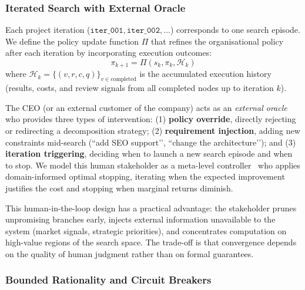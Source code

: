 \documentclass[11pt,a4paper]{article}
\begin{document}
\subsubsection{Iterated Search with External Oracle}

Each project iteration ($\texttt{iter\_001}, \texttt{iter\_002}, \ldots$) corresponds to one search episode.  We define the policy update function $\Pi$ that refines the organisational policy after each iteration by incorporating execution outcomes:
\begin{equation}
\pi_{k+1} = \Pi(s_k, \pi_k, \mathcal{H}_k)
\end{equation}
where $\mathcal{H}_k = \{(v, r, c, q)\}_{v \in \text{completed}}$ is the accumulated execution history (results, costs, and review signals from all completed nodes up to iteration $k$).

The CEO (or an external customer of the company) acts as an \emph{external oracle} who provides three types of intervention: (1) \textbf{policy override}, directly rejecting or redirecting a decomposition strategy; (2) \textbf{requirement injection}, adding new constraints mid-search (``add SEO support’’, ``change the architecture’’); and (3) \textbf{iteration triggering}, deciding when to launch a new search episode and when to stop. We model this human stakeholder as a meta-level controller~\cite{russell1991right} who applies domain-informed optimal stopping, iterating when the expected improvement justifies the cost and stopping when marginal returns diminish.

This human-in-the-loop design has a practical advantage: the stakeholder prunes unpromising branches early, injects external information unavailable to the system (market signals, strategic priorities), and concentrates computation on high-value regions of the search space. The trade-off is that convergence depends on the quality of human judgment rather than on formal guarantees.

\subsubsection{Bounded Rationality and Circuit Breakers}
\end{document}
